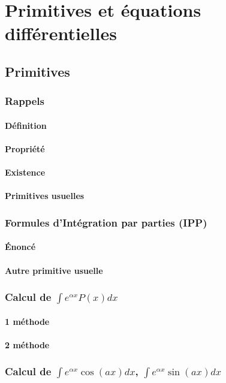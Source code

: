 \documentclass[12pt,a4paper,french]{book}
\begin{document}
\chapter{Primitives et équations différentielles}
	\section{Primitives}
		\subsection{Rappels}
			\subsubsection{Définition}
			\subsubsection{Propriété}
			\subsubsection{Existence}
			\subsubsection{Primitives usuelles}
		\subsection{Formules d'Intégration par parties (IPP)}
			\subsubsection{Énoncé}
			\subsubsection{Autre primitive usuelle}
		\subsection{Calcul de $\int e^{\alpha x}P(x)dx$}
			\subsubsection{1 méthode}
			\subsubsection{2 méthode}
		\subsection{Calcul de $\int e^{\alpha x}\cos(ax)dx$, $\int e^{\alpha x}\sin(ax)dx$}
\end{document}
